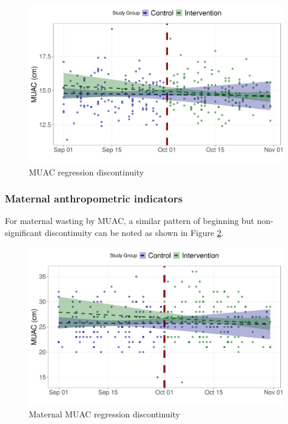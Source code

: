 \documentclass[12pt,a4paper]{article}
\begin{document}
\begin{figure}[H]

{\centering \includegraphics{kayahReport_files/figure-latex/rd5a-1} 

}

\caption{MUAC regression discontinuity}\label{fig:rd5a}
\end{figure}

\newpage

\hypertarget{maternal-anthropometric-indicators}{%
\subsubsection{Maternal anthropometric indicators}\label{maternal-anthropometric-indicators}}

For maternal wasting by MUAC, a similar pattern of beginning but non-significant discontinuity can be noted as shown in Figure \ref{fig:rd7a}.

\begin{figure}[H]

{\centering \includegraphics{kayahReport_files/figure-latex/rd7a-1} 

}

\caption{Maternal MUAC regression discontinuity}\label{fig:rd7a}
\end{figure}
\end{document}
